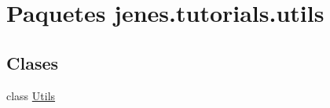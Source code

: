 \hypertarget{namespacejenes_1_1tutorials_1_1utils}{\section{Paquetes jenes.\-tutorials.\-utils}
\label{namespacejenes_1_1tutorials_1_1utils}
}
\subsection*{Clases}
\begin{DoxyCompactItemize}
\item 
class \hyperlink{classjenes_1_1tutorials_1_1utils_1_1_utils}{Utils}
\end{DoxyCompactItemize}
